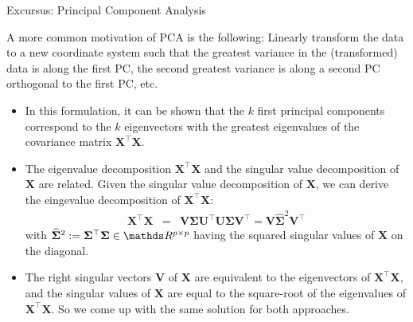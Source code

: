 \documentclass[11pt,compress,t,notes=noshow, xcolor=table]{beamer}
\begin{document}
\begin{vbframe}{Excursus: Principal Component Analysis}
\framebreak

A more common motivation of PCA is the following: Linearly transform the data to a new coordinate system such that the greatest variance in the (transformed) data is along the first PC, the second greatest variance is along a second PC orthogonal to the first PC, etc. 

\begin{itemize}
	\item In this formulation, it can be shown that the $k$ first principal components correspond to the $k$ eigenvectors with the greatest eigenvalues of the covariance matrix $\bm{X}^\top \bm{X}$. 
	\item The eigenvalue decomposition $\bm{X}^\top \bm{X}$ and the singular value decomposition of $\bm{X}$ are related. Given the singular value decomposition of $\bm{X}$, we can derive the eingevalue decomposition of $\bm{X}^\top \bm{X}$:  
	\begin{eqnarray*}
		\bm{X}^\top \bm{X} &=& \bm{V} \boldsymbol{\Sigma} \bm{U}^\top\bm{U} \boldsymbol{\Sigma} \bm{V}^\top = \bm{V} \boldsymbol{\widehat\Sigma}^2 \bm{V}^\top
	\end{eqnarray*}
	with $\boldsymbol{\widehat\Sigma}^2 := \boldsymbol{\Sigma}^\top \boldsymbol{\Sigma} \in \R^{p \times p}$ having the squared singular values of $\bm{X}$ on the diagonal.
	\item The right singular vectors $\bm{V}$ of $\bm{X}$ are equivalent to the eigenvectors of $\bm{X}^\top \bm{X}$, and the singular values of $\bm{X}$ are equal to the square-root of the eigenvalues of $\bm{X}^\top\bm{X}$. So we come up with the same solution for both approaches. 
\end{itemize}

\end{vbframe}


\endlecture
\end{document}
